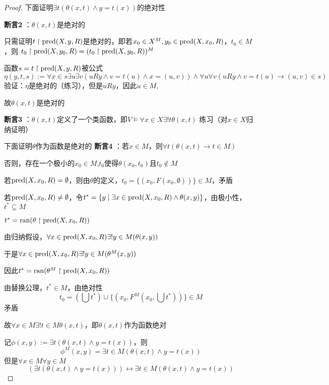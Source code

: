 \documentclass[11pt]{article}
\begin{document}
\begin{proof}
下面证明\(\exists t(\theta(x,t)\wedge y=t(x))\)的绝对性

\textbf{断言2} ：\(\theta(x,t)\)是绝对的

只需证明\(t\upharpoonright\text{pred}(X,y,R)\)是绝对的，即若\(x_0\in X^M,y_0\in\text{pred}(X,x_0,R)\)，\(t_0\in M\)，则
\(t_0\upharpoonright\text{pred}(X,y_0,R)=(t_0\upharpoonright\text{pred}(X,y_0,R))^M\)

函数\(s=t\upharpoonright\text{pred}(X,y,R)\)被公式
\begin{equation*}
\eta(y,t,s):=\forall x\in s\exists u\exists v(uRy\wedge v=t(u)\wedge x=(u,v))\wedge
\forall u\forall v(uRy\wedge v=t(u)\to (u,v)\in s)
\end{equation*}
验证：\(\eta\)是绝对的（练习），但是\(uRy\)，因此\(u\in M\),

故\(\theta(x,t)\)是绝对的

\textbf{断言3} ：\(\theta(x,t)\)定义了一个类函数，即\(V\vDash\forall x\in X\exists!t\theta(x,t)\)
练习（对\(x\in X\)归纳证明）

下面证明\(\theta\)作为函数是绝对的
\textbf{断言4} ：若\(x\in M\)，则\(\forall t(\theta(x,t)\to t\in M)\)

否则，存在一个极小的\(x_0\in M\),\(t_0\)使得\(\theta(x_0,t_0)\)且\(t_0\notin M\)

若\(\text{pred}(X,x_0,R)=\emptyset\)，则由\(\theta\)的定义，\(t_0=\{(x_0,F(x_0,\emptyset))\}\in M\)，矛盾

若\(\text{pred}(X,x_0,R)\neq\emptyset\)，令\(t^*=\{y\mid\exists x\in\text{pred}(X,x_0,R)\wedge\theta(x,y)\}\)，由极小性，\(t^*\subseteq M\)

\(t^*=\operatorname{ran}(\theta\upharpoonright\text{pred}(X,x_0,R))\)

由归纳假设，\(\forall x\in\text{pred}(X,x_0,R)\exists!y\in M(\theta(x,y))\)

于是\(\forall x\in\text{pred}(X,x_0,R)\exists!y\in M(\theta^M(x,y))\)

因此\(t^*=\operatorname{ran}(\theta^M\upharpoonright\text{pred}(X,x_0,R))\)

由替换公理，\(t^*\in M\)，由绝对性
\begin{equation*}
t_0=(\bigcup t^*)\cup\{(x_0,F^M(x_0,\bigcup t^*))\}\in M
\end{equation*}
矛盾

故\(\forall x\in M\exists! t\in M\theta(x,t)\)，即\(\theta(x,t)\)作为函数绝对

记\(\phi(x,y):=\exists t(\theta(x,t)\wedge y=t(x))\)，则
\begin{equation*}
\phi^M(x,y)=\exists t\in M(\theta(x,t)\wedge y=t(x))
\end{equation*}
但是\(\forall x\in M\forall y\in M\)
\begin{equation*}
(\exists t(\theta(x,t)\wedge y=t(x)))\leftrightarrow\exists t\in M(\theta(x,t)\wedge y=t(x))
\end{equation*}


\end{proof}
\end{document}

